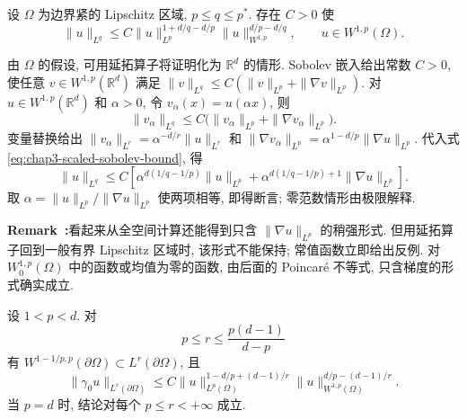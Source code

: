 \begin{Proposition}
\label{prop:chap3-gagliardo-nirenberg-interpolation}
设 $\Omega$ 为边界紧的 Lipschitz 区域, $p\leq q\leq p^*$. 存在 $C>0$ 使
\[
 \|u\|_{L^q}\leq C\|u\|_{L^p}^{1+d/q-d/p}
 \|u\|_{W^{1,p}}^{d/p-d/q},
 \qquad u\in W^{1,p}(\Omega).
\]
\end{Proposition}

\begin{Proof}
由 $\Omega$ 的假设, 可用延拓算子将证明化为 $\mathbb R^d$ 的情形. Sobolev 嵌入给出常数 $C>0$, 使任意 $v\in W^{1,p}(\mathbb R^d)$ 满足 $\|v\|_{L^q}\leq C(\|v\|_{L^p}+\|\nabla v\|_{L^p})$. 对 $u\in W^{1,p}(\mathbb R^d)$ 和 $\alpha>0$, 令 $v_\alpha(x)=u(\alpha x)$, 则
\begin{equation}
 \|v_\alpha\|_{L^q}\leq C\bigl(\|v_\alpha\|_{L^p}+\|\nabla v_\alpha\|_{L^p}\bigr).
 \label{eq:chap3-scaled-sobolev-bound}
\end{equation}
变量替换给出 $\|v_\alpha\|_{L^r}=\alpha^{-d/r}\|u\|_{L^r}$ 和 $\|\nabla v_\alpha\|_{L^p}=\alpha^{1-d/p}\|\nabla u\|_{L^p}$. 代入式\eqref{eq:chap3-scaled-sobolev-bound}, 得
\[
 \|u\|_{L^q}\leq C\left[
 \alpha^{d(1/q-1/p)}\|u\|_{L^p}
 +\alpha^{d(1/q-1/p)+1}\|\nabla u\|_{L^p}
 \right].
\]
取 $\alpha=\|u\|_{L^p}/\|\nabla u\|_{L^p}$ 使两项相等, 即得断言; 零范数情形由极限解释.
\end{Proof}

\par\noindent{}\textbf{Remark~\thechapterthreesectiontworemark:}\label{rem:chap3-stronger-boundary-embedding-caveat}\quad 看起来从全空间计算还能得到只含 $\|\nabla u\|_{L^p}$ 的稍强形式. 但用延拓算子回到一般有界 Lipschitz 区域时, 该形式不能保持; 常值函数立即给出反例. 对 $W_0^{1,p}(\Omega)$ 中的函数或均值为零的函数, 由后面的 Poincar\'e 不等式, 只含梯度的形式确实成立.

\begin{Theorem}
\label{thm:chap3-boundary-sobolev-embedding}
设 $1<p<d$. 对
\[
 p\leq r\leq\frac{p(d-1)}{d-p}
\]
有 $W^{1-1/p,p}(\partial\Omega)\subset L^r(\partial\Omega)$, 且
\begin{equation}
 \|\gamma_0u\|_{L^r(\partial\Omega)}
 \leq C\|u\|_{L^p(\Omega)}^{1-d/p+(d-1)/r}
 \|u\|_{W^{1,p}(\Omega)}^{d/p-(d-1)/r}.
 \label{eq:chap3-boundary-interpolation-inequality}
\end{equation}
当 $p=d$ 时, 结论对每个 $p\leq r<+\infty$ 成立.
\end{Theorem}

